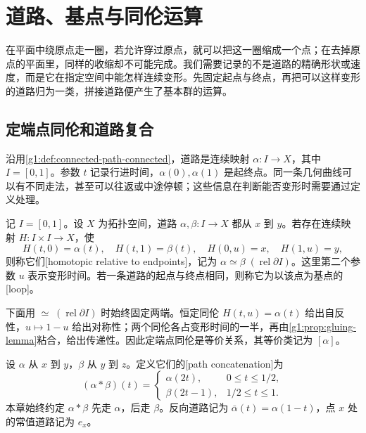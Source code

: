 
% 
% 

\section{道路、基点与同伦运算}
\label{g1:sec:0501}

在平面中绕原点走一圈，若允许穿过原点，就可以把这一圈缩成一个点；在去掉原点的平面里，同样的收缩却不可能完成。我们需要记录的不是道路的精确形状或速度，而是它在指定空间中能怎样连续变形。先固定起点与终点，再把可以这样变形的道路归为一类，拼接道路便产生了基本群的运算。

\subsection{定端点同伦和道路复合}
\label{g1:subsec:0501:01}

沿用\cref{g1:def:connected-path-connected}，道路是连续映射 \(\alpha:I\rightarrow X\)，其中 \(I=[0,1]\)。参数 \(t\) 记录行进时间，\(\alpha(0),\alpha(1)\) 是起终点。同一条几何曲线可以有不同走法，甚至可以往返或中途停顿；这些信息在判断能否变形时需要通过定义处理。

\begin{definition}\label{g1:def:path-homotopy}
	记 \(I=[0,1]\)。设 \(X\) 为拓扑空间，道路 \(\alpha,\beta:I\rightarrow X\) 都从 \(x\) 到 \(y\)。若存在连续映射 \(H:I\times I\rightarrow X\)，使
	\[
		H(t,0)=\alpha(t),\quad H(t,1)=\beta(t),\quad
		H(0,u)=x,\quad H(1,u)=y,
	\]
	则称它们[homotopic relative to endpoints]，记为 \(\alpha\simeq\beta\;(\operatorname{rel}\partial I)\)。这里第二个参数 \(u\) 表示变形时间。若一条道路的起点与终点相同，则称它为以该点为基点的[loop]。
\end{definition}

下面用 \(\simeq\;(\operatorname{rel}\partial I)\) 时始终固定两端。恒定同伦 \(H(t,u)=\alpha(t)\) 给出自反性，\(u\mapsto1-u\) 给出对称性；两个同伦各占变形时间的一半，再由\cref{g1:prop:gluing-lemma}粘合，给出传递性。因此定端点同伦是等价关系，其等价类记为 \([\alpha]\)。

\begin{definition}\label{g1:def:path-concatenation}
	设 \(\alpha\) 从 \(x\) 到 \(y\)，\(\beta\) 从 \(y\) 到 \(z\)。定义它们的[path concatenation]为
	\[
		(\alpha*\beta)(t)=
		\begin{cases}
			\alpha(2t),&0\le t\le1/2,\\
			\beta(2t-1),&1/2\le t\le1.
		\end{cases}
	\]
	本章始终约定 \(\alpha*\beta\) 先走 \(\alpha\)，后走 \(\beta\)。反向道路记为 \(\bar\alpha(t)=\alpha(1-t)\)，点 \(x\) 处的常值道路记为 \(e_x\)。
\end{definition}

